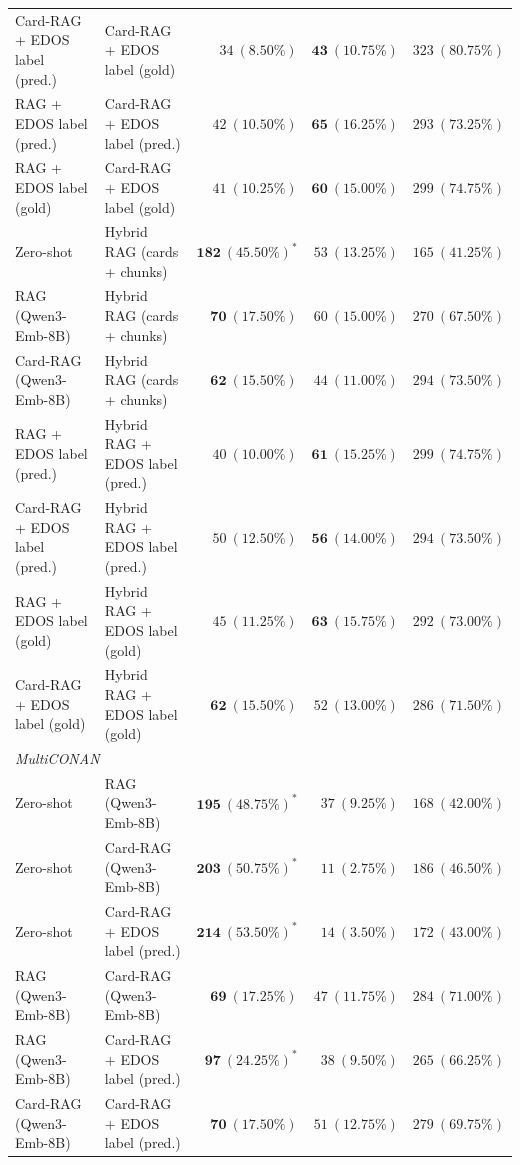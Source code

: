 \begin{table}[t]
{\begin{tabular}{llrrr}
Card-RAG + EDOS label (pred.) & Card-RAG + EDOS label (gold) & $34\ (8.50\%)$ & $\mathbf{43\ (10.75\%)}$ & $323\ (80.75\%)$ \\
RAG + EDOS label (pred.) & Card-RAG + EDOS label (pred.) & $42\ (10.50\%)$ & $\mathbf{65\ (16.25\%)}$ & $293\ (73.25\%)$ \\
RAG + EDOS label (gold) & Card-RAG + EDOS label (gold) & $41\ (10.25\%)$ & $\mathbf{60\ (15.00\%)}$ & $299\ (74.75\%)$ \\
Zero-shot & Hybrid RAG (cards + chunks) & $\mathbf{182\ (45.50\%)}^*$ & $53\ (13.25\%)$ & $165\ (41.25\%)$ \\
RAG (Qwen3-Emb-8B) & Hybrid RAG (cards + chunks) & $\mathbf{70\ (17.50\%)}$ & $60\ (15.00\%)$ & $270\ (67.50\%)$ \\
Card-RAG (Qwen3-Emb-8B) & Hybrid RAG (cards + chunks) & $\mathbf{62\ (15.50\%)}$ & $44\ (11.00\%)$ & $294\ (73.50\%)$ \\
RAG + EDOS label (pred.) & Hybrid RAG + EDOS label (pred.) & $40\ (10.00\%)$ & $\mathbf{61\ (15.25\%)}$ & $299\ (74.75\%)$ \\
Card-RAG + EDOS label (pred.) & Hybrid RAG + EDOS label (pred.) & $50\ (12.50\%)$ & $\mathbf{56\ (14.00\%)}$ & $294\ (73.50\%)$ \\
RAG + EDOS label (gold) & Hybrid RAG + EDOS label (gold) & $45\ (11.25\%)$ & $\mathbf{63\ (15.75\%)}$ & $292\ (73.00\%)$ \\
Card-RAG + EDOS label (gold) & Hybrid RAG + EDOS label (gold) & $\mathbf{62\ (15.50\%)}$ & $52\ (13.00\%)$ & $286\ (71.50\%)$ \\
\midrule
\multicolumn{5}{l}{\textit{MultiCONAN}} \\
Zero-shot & RAG (Qwen3-Emb-8B) & $\mathbf{195\ (48.75\%)}^*$ & $37\ (9.25\%)$ & $168\ (42.00\%)$ \\
Zero-shot & Card-RAG (Qwen3-Emb-8B) & $\mathbf{203\ (50.75\%)}^*$ & $11\ (2.75\%)$ & $186\ (46.50\%)$ \\
Zero-shot & Card-RAG + EDOS label (pred.) & $\mathbf{214\ (53.50\%)}^*$ & $14\ (3.50\%)$ & $172\ (43.00\%)$ \\
RAG (Qwen3-Emb-8B) & Card-RAG (Qwen3-Emb-8B) & $\mathbf{69\ (17.25\%)}$ & $47\ (11.75\%)$ & $284\ (71.00\%)$ \\
RAG (Qwen3-Emb-8B) & Card-RAG + EDOS label (pred.) & $\mathbf{97\ (24.25\%)}^*$ & $38\ (9.50\%)$ & $265\ (66.25\%)$ \\
Card-RAG (Qwen3-Emb-8B) & Card-RAG + EDOS label (pred.) & $\mathbf{70\ (17.50\%)}$ & $51\ (12.75\%)$ & $279\ (69.75\%)$ \\

\end{tabular}}
\end{table}
